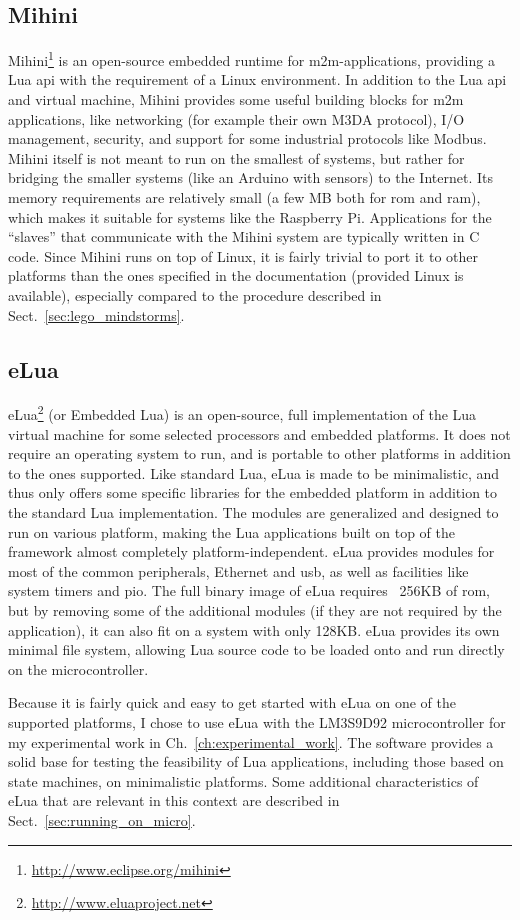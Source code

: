 \subsection{Mihini}
\label{sec:mihini}
Mihini\footnote{\url{http://www.eclipse.org/mihini}} is an open-source embedded runtime for \gls{m2m}-applications, providing a Lua \gls{api} with the requirement of a Linux environment. In addition to the Lua \gls{api} and virtual machine, Mihini provides some useful building blocks for \gls{m2m} applications, like networking (for example their own M3DA protocol), I/O management, security, and support for some industrial protocols like Modbus. Mihini itself is not meant to run on the smallest of systems, but rather for bridging the smaller systems (like an Arduino with sensors) to the Internet. Its memory requirements are relatively small (a few MB both for \gls{rom} and \gls{ram}), which makes it suitable for systems like the Raspberry Pi. Applications for the ``slaves'' that communicate with the Mihini system are typically written in C code. Since Mihini runs on top of Linux, it is fairly trivial to port it to other platforms than the ones specified in the documentation (provided Linux is available), especially compared to the procedure described in Sect.~\ref{sec:lego_mindstorms}.

\subsection{eLua}
\label{sec:elua}
eLua\footnote{\url{http://www.eluaproject.net}} (or Embedded Lua) is an open-source, full implementation of the Lua virtual machine for some selected processors and embedded platforms. It does not require an operating system to run, and is portable to other platforms in addition to the ones supported. Like standard Lua, eLua is made to be minimalistic, and thus only offers some specific libraries for the embedded platform in addition to the standard Lua implementation. The modules are generalized and designed to run on various platform, making the Lua applications built on top of the framework almost completely platform-independent. eLua provides modules for most of the common peripherals, Ethernet and \gls{usb}, as well as facilities like system timers and \gls{pio}. The full binary image of eLua requires ~256KB of \gls{rom}, but by removing some of the additional modules (if they are not required by the application), it can also fit on a system with only 128KB. eLua provides its own minimal file system, allowing Lua source code to be loaded onto and run directly on the microcontroller.

\noindent
Because it is fairly quick and easy to get started with eLua on one of the supported platforms, I chose to use eLua with the LM3S9D92 microcontroller for my experimental work in Ch.~\ref{ch:experimental_work}. The software provides a solid base for testing the feasibility of Lua applications, including those based on state machines, on minimalistic platforms. Some additional characteristics of eLua that are relevant in this context are described in Sect.~\ref{sec:running_on_micro}.